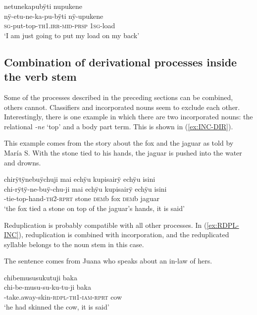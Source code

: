 \ea\label{ex:relational-verb-inc}
\begingl
\glpreamble netunekapubÿti nupukene\\
\gla nÿ-etu-ne-ka-pu-bÿti nÿ-upukene\\
\textsc{sg}-put-top-\textsc{th}1\textsc{.irr}-\textsc{mid}-\textsc{prsp} 1\textsc{sg}-load\\
\glft ‘I am just going to put my load on my back’
\endgl
\trailingcitation{[rxx-e181020le]}
\xe



\subsection{Combination of derivational processes inside the verb stem}%
\label{sec:ActiveVerbs_Combi}

\largerpage
Some of the processes described in the preceding sections can be combined, others cannot. Classifiers and incorporated nouns seem to exclude each other. Interestingly, there is one example in which there are two incorporated nouns: the relational \textit{-ne} ‘top’ and a body part term. This is shown in (\ref{ex:INC-DIR}).

This example comes from the story about the fox and the jaguar as told by María S. With the stone tied to his hands, the jaguar is pushed into the water and drowns.

\newpage
\ea\label{ex:INC-DIR}
\begingl
\glpreamble chirÿtÿnebuÿchuji mai echÿu kupisairÿ echÿu isini\\
\gla chi-rÿtÿ-ne-buÿ-chu-ji mai echÿu kupisairÿ echÿu isini\\
-tie-top-hand-\textsc{th}2-\textsc{rprt} stone \textsc{dem}b fox \textsc{dem}b jaguar\\
\glft ‘the fox tied a stone on top of the jaguar’s hands, it is said’
\endgl
\trailingcitation{[rxx-n120511l-1.037]}
\xe

Reduplication is probably compatible with all other processes. In (\ref{ex:RDPL-INC}), reduplication is combined with incorporation, and the reduplicated syllable belongs to the noun stem in this case.

The sentence comes from Juana who speaks about an in-law of hers.

\ea\label{ex:RDPL-INC}
\begingl
\glpreamble chibemususukutuji baka\\
\gla chi-be-musu-su-ku-tu-ji baka\\
-take.away-skin-\textsc{rdpl}-\textsc{th}1-\textsc{iam}-\textsc{rprt} cow\\
\glft ‘he had skinned the cow, it is said’
\endgl
\trailingcitation{[jxx-p120430l-2.081]}
\xe
{}

